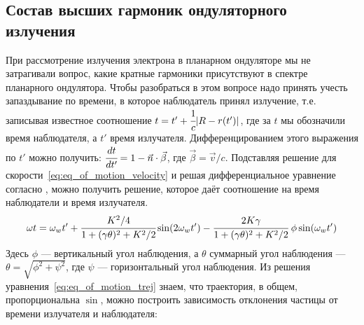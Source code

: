 \subsection{Состав высших гармоник ондуляторного излучения}
При рассмотрение излучения электрона в планарном ондуляторе мы не затрагивали вопрос, какие кратные гармоники присутствуют в спектре планарного ондулятора. Чтобы разобраться в этом вопросе надо принять учесть запаздывание по времени, в которое наблюдатель принял излучение, т.е. записывая известное соотношение $t = t' + \cfrac{1}{c} |R - r(t')|$, где за $t$ мы обозначили время наблюдателя, а $t'$ время излучателя. Дифференцированием этого выражения по $t'$ можно получить: $\cfrac{dt}{dt'} = 1 - \vec{n}\cdot\vec{\beta}$, где $\vec{\beta} = \vec{v}/c$. Подставляя решение для скорости~\ref{eq:eq_of_motion_velocity} и решая дифференциальное уравнение согласно \cite{als2011elements}, можно получить решение, которое даёт соотношение на время наблюдатели и время излучателя.
\begin{equation}
	\label{eq:t_t'}
	\omega t = \omega_w t' + \cfrac{K^2/4}{1 + (\gamma \theta)^2 + K^2/2} \sin(2 \omega_w t') - \cfrac{2K\gamma}{1 + (\gamma \theta)^2 + K^2/2} \; \phi \sin(\omega_w t') 	
\end{equation}
Здесь $\phi$ --- вертикальный угол наблюдения, а $\theta$ суммарный угол наблюдения --- $\theta = \sqrt{\phi^2 + \psi^2}$, где $\psi$ --- горизонтальный угол наблюдения. Из решения уравнения~\ref{eq:eq_of_motion_trej} знаем, что траектория, в общем, пропорциональна $\sin$, можно построить зависимость отклонения частицы от времени излучателя и наблюдателя:
